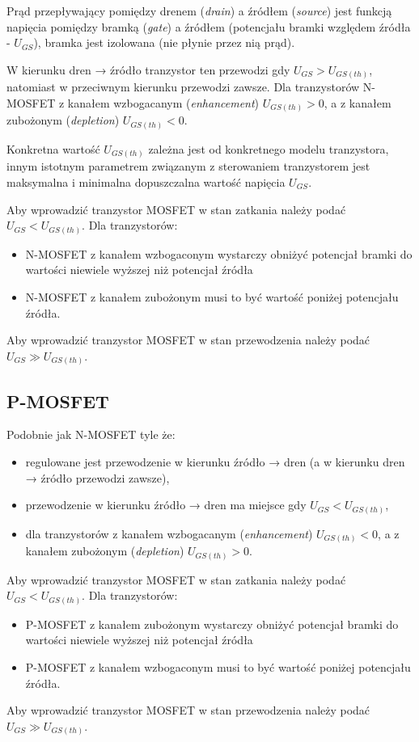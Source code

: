 \documentclass{pdfBooklets}
\begin{document}
Prąd przepływający pomiędzy drenem (\emph{drain}) a źródłem (\emph{source}) jest funkcją napięcia pomiędzy bramką (\emph{gate}) a źródłem (potencjału bramki względem źródła - $U_{GS}$), bramka jest izolowana (nie płynie przez nią prąd).

W kierunku dren → źródło tranzystor ten przewodzi gdy $U_{GS} > U_{GS (th)}$, natomiast w przeciwnym kierunku przewodzi zawsze. Dla tranzystorów N-MOSFET z kanałem wzbogacanym (\emph{enhancement}) $U_{GS (th)} > 0$, a z kanałem zubożonym (\emph{depletion}) $U_{GS (th)} < 0$.

Konkretna wartość $U_{GS (th)}$ zależna jest od konkretnego modelu tranzystora, innym istotnym parametrem związanym z sterowaniem tranzystorem jest maksymalna i minimalna dopuszczalna wartość napięcia $U_{GS}$.

Aby wprowadzić tranzystor MOSFET w stan zatkania należy podać $U_{GS} < U_{GS (th)}$. Dla tranzystorów:
\begin{itemize}
\item N-MOSFET z kanałem wzbogaconym wystarczy obniżyć potencjał bramki do wartości niewiele wyższej niż potencjał źródła
\item N-MOSFET z kanałem zubożonym musi to być wartość poniżej potencjału źródła.
\end{itemize}
Aby wprowadzić tranzystor MOSFET w stan przewodzenia należy podać $U_{GS} \gg U_{GS (th)}$.

\subsection{P-MOSFET}
Podobnie jak N-MOSFET tyle że:
\begin{itemize}
\item regulowane jest przewodzenie w kierunku źródło → dren (a w kierunku dren → źródło przewodzi zawsze),
\item przewodzenie w kierunku źródło → dren ma miejsce gdy $U_{GS} < U_{GS (th)}$,
\item dla tranzystorów z kanałem wzbogacanym (\emph{enhancement}) $U_{GS (th)} < 0$, a z kanałem zubożonym (\emph{depletion}) $U_{GS (th)} > 0$.
\end{itemize}

Aby wprowadzić tranzystor MOSFET w stan zatkania należy podać $U_{GS} < U_{GS (th)}$. Dla tranzystorów:
\begin{itemize}
\item P-MOSFET z kanałem zubożonym wystarczy obniżyć potencjał bramki do wartości niewiele wyższej niż potencjał źródła
\item P-MOSFET z kanałem wzbogaconym musi to być wartość poniżej potencjału źródła.
\end{itemize}
Aby wprowadzić tranzystor MOSFET w stan przewodzenia należy podać $U_{GS} \gg U_{GS (th)}$.
\end{document}
